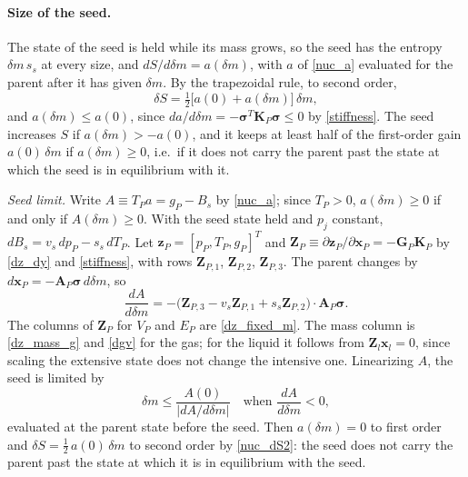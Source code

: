 \paragraph{Size of the seed.}
The state of the seed is held while its mass grows, so the seed has the entropy $\delta m\,s_s$ at every size, and $dS/d\delta m=a(\delta m)$, with $a$ of \eqref{nuc_a} evaluated for the parent after it has given $\delta m$. By the trapezoidal rule, to second order,
\begin{equation}\label{nuc_dS2}
\delta S=\tfrac12\bigl[a(0)+a(\delta m)\bigr]\,\delta m,
\end{equation}
and $a(\delta m)\le a(0)$, since $da/d\delta m=-\boldsymbol{\sigma}^T\boldsymbol{K}_P\boldsymbol{\sigma}\le0$ by \eqref{stiffness}. The seed increases $S$ if $a(\delta m)>-a(0)$, and it keeps at least half of the first-order gain $a(0)\,\delta m$ if $a(\delta m)\ge0$, i.e.\ if it does not carry the parent past the state at which the seed is in equilibrium with it.

\emph{Seed limit.} Write $A\equiv T_Pa=g_P-B_s$ by \eqref{nuc_a}; since $T_P>0$, $a(\delta m)\ge0$ if and only if $A(\delta m)\ge0$. With the seed state held and $p_{j}$ constant, $dB_s=v_s\,dp_P-s_s\,dT_P$. Let $\boldsymbol{z}_P=[p_P,T_P,g_P]^T$ and $\boldsymbol{Z}_P\equiv\partial\boldsymbol{z}_P/\partial\boldsymbol{x}_P=-\boldsymbol{G}_P\boldsymbol{K}_P$ by \eqref{dz_dy} and \eqref{stiffness}, with rows $\boldsymbol{Z}_{P,1}$, $\boldsymbol{Z}_{P,2}$, $\boldsymbol{Z}_{P,3}$. The parent changes by $d\boldsymbol{x}_P=-\boldsymbol{A}_P\boldsymbol{\sigma}\,d\delta m$, so
\begin{equation}\label{nuc_dA}
\frac{dA}{d\delta m}=-\bigl(\boldsymbol{Z}_{P,3}-v_s\boldsymbol{Z}_{P,1}+s_s\boldsymbol{Z}_{P,2}\bigr)\cdot\boldsymbol{A}_P\boldsymbol{\sigma}.
\end{equation}
The columns of $\boldsymbol{Z}_P$ for $V_P$ and $E_P$ are \eqref{dz_fixed_m}. The mass column is \eqref{dz_mass_g} and \eqref{dgv} for the gas; for the liquid it follows from $\boldsymbol{Z}_l\boldsymbol{x}_l=0$, since scaling the extensive state does not change the intensive one. Linearizing $A$, the seed is limited by
\begin{equation}\label{nuc_cap}
\delta m\le\frac{A(0)}{|dA/d\delta m|}\quad\text{when }\frac{dA}{d\delta m}<0,
\end{equation}
evaluated at the parent state before the seed. Then $a(\delta m)=0$ to first order and $\delta S=\tfrac12\,a(0)\,\delta m$ to second order by \eqref{nuc_dS2}: the seed does not carry the parent past the state at which it is in equilibrium with the seed.

